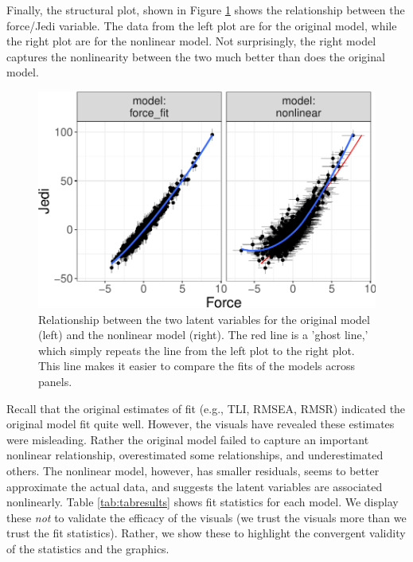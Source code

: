 \documentclass[
  english,
  man]{apa6}
\begin{document}
Finally, the structural plot, shown in Figure \ref{fig:structureNonlin} shows the relationship between the force/Jedi variable. The data from the left plot are for the original model, while the right plot are for the nonlinear model. Not surprisingly, the right model captures the nonlinearity between the two much better than does the original model.

\begin{figure}

{\centering \includegraphics[width=0.6\linewidth]{flexplavaan_draft_files/figure-latex/structureNonlin-1} 

}

\caption{Relationship between the two latent variables for the original model (left) and the nonlinear model (right). The red line is a 'ghost line,' which simply repeats the line from the left plot to the right plot. This line makes it easier to compare the fits of the models across panels.}\label{fig:structureNonlin}
\end{figure}

Recall that the original estimates of fit (e.g., TLI, RMSEA, RMSR) indicated the original model fit quite well. However, the visuals have revealed these estimates were misleading. Rather the original model failed to capture an important nonlinear relationship, overestimated some relationships, and underestimated others. The nonlinear model, however, has smaller residuals, seems to better approximate the actual data, and suggests the latent variables are associated nonlinearly. Table \ref{tab:tabresults} shows fit statistics for each model. We display these \emph{not} to validate the efficacy of the visuals (we trust the visuals more than we trust the fit statistics). Rather, we show these to highlight the convergent validity of the statistics and the graphics.
\end{document}
